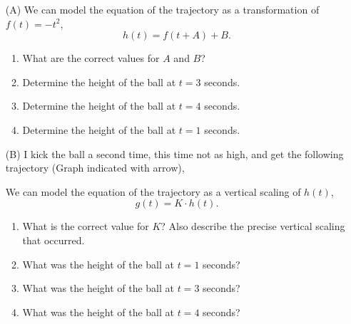 \documentclass[12pt]{article} %
\begin{document}
\begin{qstn}
\begin{qstn}
\begin{enumerate}[label=(\alph*)]
  \item[(A)] We can model the equation of the trajectory as a transformation of $f(t) = -t^2$, 
        \[
              h(t) = f(t + A) + B
        .\] 
        \begin{enumerate}[label=(\alph*)]
          \item What are the correct values for $A$ and $B$?
          \item Determine the height of the ball at $t = 3$ seconds.
          \item Determine the height of the ball at $t = 4$ seconds.
          \item Determine the height of the ball at $t = 1$ seconds.
        \end{enumerate}
  \item[(B)] I kick the ball a second time, this time not as high, and get the following trajectory (Graph
    indicated with arrow),
      \begin{center}
      \end{center}
      \newpage
      We can model the equation of the trajectory as a vertical scaling of $h(t)$, 
        \[
              g(t) = K\cdot h(t)
        .\] 
    \begin{enumerate}[label=(\alph*)]
      \item What is the correct value for $K$? Also describe the precise vertical scaling that occurred.
      \item What was the height of the ball at $t = 1$ seconds?
      \item What was the height of the ball at $t = 3$ seconds?
      \item What was the height of the ball at $t = 4$ seconds?
    \end{enumerate}



\end{enumerate}
\end{qstn}
\end{qstn}
\end{document}
